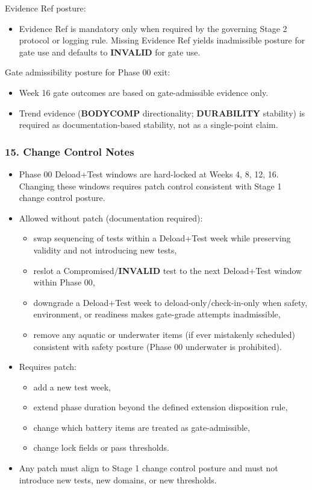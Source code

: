 \documentclass[10pt]{article}
\begin{document}
Evidence Ref posture:

\begin{itemize}
\item Evidence Ref is mandatory only when required by the governing Stage 2 protocol or logging rule. Missing Evidence Ref yields inadmissible posture for gate use and defaults to \textbf{INVALID} for gate use.
\end{itemize}

Gate admissibility posture for Phase 00 exit:

\begin{itemize}
\item Week 16 gate outcomes are based on gate-admissible evidence only.
\item Trend evidence (\textbf{BODYCOMP} directionality; \textbf{DURABILITY} stability) is required as documentation-based stability, not as a single-point claim.
\end{itemize}

\subsubsection*{15. Change Control Notes}

\begin{itemize}
\item Phase 00 Deload+Test windows are hard-locked at Weeks 4, 8, 12, 16. Changing these windows requires patch control consistent with Stage 1 change control posture.

\item Allowed without patch (documentation required):
  \begin{itemize}
  \item swap sequencing of tests within a Deload+Test week while preserving validity and not introducing new tests,
  \item reslot a Compromised/\textbf{INVALID} test to the next Deload+Test window within Phase 00,
  \item downgrade a Deload+Test week to deload-only/check-in-only when safety, environment, or readiness makes gate-grade attempts inadmissible,
  \item remove any aquatic or underwater items (if ever mistakenly scheduled) consistent with safety posture (Phase 00 underwater is prohibited).
  \end{itemize}

\item Requires patch:
  \begin{itemize}
  \item add a new test week,
  \item extend phase duration beyond the defined extension disposition rule,
  \item change which battery items are treated as gate-admissible,
  \item change lock fields or pass thresholds.
  \end{itemize}

\item Any patch must align to Stage 1 change control posture and must not introduce new tests, new domains, or new thresholds.
\end{itemize}
\end{document}
